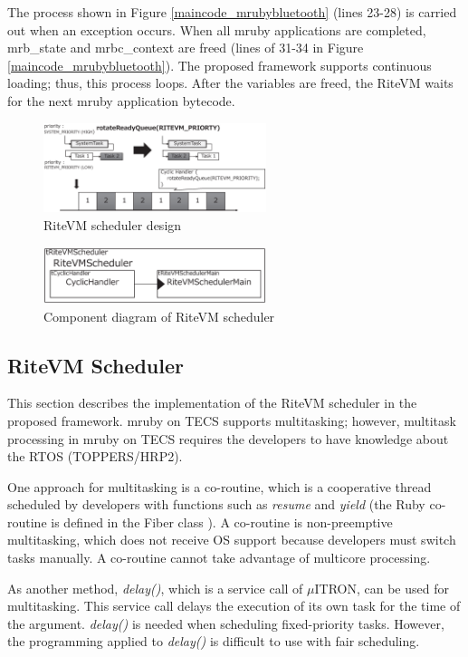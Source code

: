 \documentclass[S,R,E]{article/compsoft}
\begin{document}
The process shown in Figure \ref{maincode_mrubybluetooth} (lines 23-28) is carried out when an exception occurs.
When all mruby applications are completed, mrb\_state and mrbc\_context are freed (lines of 31-34 in Figure \ref{maincode_mrubybluetooth}).
The proposed framework supports continuous loading; thus, this process loops.
After the variables are freed, the RiteVM waits for the next mruby application bytecode.

\begin{figure}[t]
    \centering
    \includegraphics[width=6.5cm,clip]{figure/rotateReadyQueue.eps}
\caption{RiteVM scheduler design}
\label{fig:rotateReadyQueue}
\end{figure} 

\begin{figure}[t]
    \centering
    \includegraphics[width=6.5cm,clip]{figure/cyclic_handler.eps}
\caption{Component diagram of RiteVM scheduler}
\label{fig:cyclic_handler}
\end{figure}

\subsection{RiteVM Scheduler}
\label{sec:RiteVM Scheduler}
This section describes the implementation of the RiteVM scheduler in the proposed framework.
mruby on TECS supports multitasking; however, multitask processing in mruby on TECS requires the developers to have knowledge about the RTOS (TOPPERS/HRP2).

One approach for multitasking is a co-routine, which is a cooperative thread scheduled by developers with functions such as {\it resume} and {\it yield} (the Ruby co-routine is defined in the Fiber class \cite{url:co-routine}).
A co-routine is non-preemptive multitasking, which does not receive OS support because developers must switch tasks manually.
A co-routine cannot take advantage of multicore processing.

As another method, {\it delay()}, which is a service call of $\mu$ITRON, can be used for multitasking.
This service call delays the execution of its own task for the time of the argument.
{\it delay()} is needed when scheduling fixed-priority tasks.
However, the programming applied to {\it delay()} is difficult to use with fair scheduling.
\end{document}
